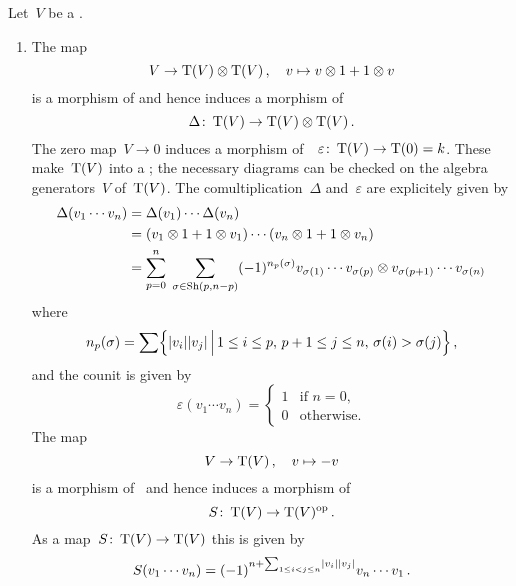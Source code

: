 \documentclass[a4paper,10pt,headings=standardclasses]{scrartcl}
\begin{document}
\begin{example}
  Let~$V$ be a {\dgv}.
  \begin{enumerate}
    \item
      The map
      \[
        V
        \to
        \operatorname{T}(V) \otimes \operatorname{T}(V) \,,
        \quad
        v
        \mapsto
        v \otimes 1 + 1 \otimes v
      \]
      is a morphism of {\dgv} and hence induces a morphism of~{\dgas}
      \[
        \Delta
        \colon
        \operatorname{T}(V)
        \to
        \operatorname{T}(V) \otimes \operatorname{T}(V) \,.
      \]
      The zero map~$V \to 0$ induces a morphism of~{\dgas}~$\varepsilon \colon \operatorname{T}(V) \to \operatorname{T}(0) = k$.
      These make~$\operatorname{T}(V)$ into a {\dgb};
      the necessary diagrams can be checked on the algebra generators~$V$ of~$\operatorname{T}(V)$.
      The comultiplication~$\Delta$ and~$\varepsilon$ are explicitely given by
      \begin{align*}
        \Delta(v_1 \dotsm v_n)
        &=
        \Delta(v_1) \dotsm \Delta(v_n)
        \\
        &=
        (v_1 \otimes 1 + 1 \otimes v_1)
        \dotsm
        (v_n \otimes 1 + 1 \otimes v_n)
        \\
        &=
        \sum_{p=0}^n
        \;
        \sum_{\sigma \in \operatorname{Sh}(p,n-p)}
        (-1)^{n_p(\sigma)}
        v_{\sigma(1)} \dotsm v_{\sigma(p)}
        \otimes
        v_{\sigma(p+1)} \dotsm v_{\sigma(n)}
      \end{align*}
      where
      \[
        n_p(\sigma)
        =
        \sum
        \Bigl\{
          \hdeg{v_i} \hdeg{v_j}
        \suchthat[\Big]
          1 \leq i \leq p, \,
          p+1 \leq j \leq n, \,
          \sigma(i) > \sigma(j)
        \Bigr\} \,,
      \]
      and the counit is given by
      \[
        \varepsilon( v_1 \dotsm v_n )
        =
        \begin{cases}
          1 & \text{if~$n = 0$}, \\
          0 & \text{otherwise}.
        \end{cases}
      \]
      The map
      \[
        V
        \to
        \operatorname{T}(V) \,,
        \quad
        v
        \mapsto
        -v
      \]
      is a morphism of~{\dgvs} and hence induces a morphism of {\dgvs}
      \[
        S
        \colon
        \operatorname{T}(V)
        \to
        \operatorname{T}(V)^{\mathrm{op}} \,.
      \]
      As a map~$S \colon \operatorname{T}(V) \to \operatorname{T}(V)$ this is given by
      \[
        S(v_1 \dotsm v_n)
        =
        (-1)^{n + \sum_{1 \leq i < j \leq n} \lvert v_i\rvert \lvert v_j\rvert}
        v_n \dotsm v_1  \,.
\]
\end{enumerate}
\end{example}
\end{document}
